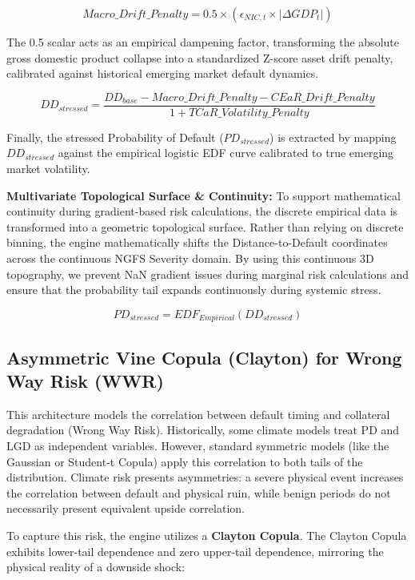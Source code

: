 \documentclass[11pt]{article}
\begin{document}
\begin{equation}
Macro\_Drift\_Penalty = 0.5 \times (\epsilon_{NIC,t} \times |\Delta GDP_t|)
\end{equation}

The 0.5 scalar acts as an empirical dampening factor, transforming the absolute gross domestic product collapse into a standardized Z-score asset drift penalty, calibrated against historical emerging market default dynamics.

\begin{equation}
DD_{stressed} = \frac{DD_{base} - Macro\_Drift\_Penalty - CEaR\_Drift\_Penalty}{1 + TCaR\_Volatility\_Penalty}
\end{equation}

Finally, the stressed Probability of Default ($PD_{stressed}$) is extracted by mapping $DD_{stressed}$ against the empirical logistic EDF curve calibrated to true emerging market volatility.

\textbf{Multivariate Topological Surface \& Continuity:} To support mathematical continuity during gradient-based risk calculations, the discrete empirical data is transformed into a geometric topological surface. Rather than relying on discrete binning, the engine mathematically shifts the Distance-to-Default coordinates across the continuous NGFS Severity domain. By using this continuous 3D topography, we prevent NaN gradient issues during marginal risk calculations and ensure that the probability tail expands continuously during systemic stress.

\begin{equation}
PD_{stressed} = EDF_{Empirical}(DD_{stressed})
\end{equation}

\subsection{Asymmetric Vine Copula (Clayton) for Wrong Way Risk (WWR)}
This architecture models the correlation between default timing and collateral degradation (Wrong Way Risk). Historically, some climate models treat PD and LGD as independent variables. However, standard symmetric models (like the Gaussian or Student-t Copula) apply this correlation to both tails of the distribution. Climate risk presents asymmetries: a severe physical event increases the correlation between default and physical ruin, while benign periods do not necessarily present equivalent upside correlation.

To capture this risk, the engine utilizes a \textbf{Clayton Copula}. The Clayton Copula exhibits lower-tail dependence and zero upper-tail dependence, mirroring the physical reality of a downside shock:
\end{document}
